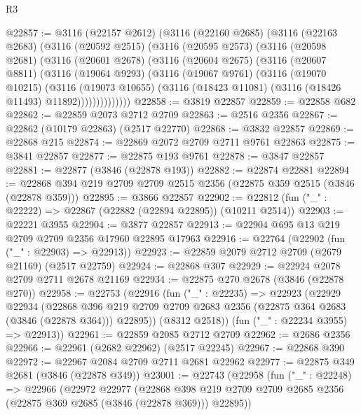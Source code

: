 \begin{lexlean}{R3}
\begin{coremodule}
@22857 := @3116
    (@22157 @2612)
    (@3116
      (@22160 @2685)
      (@3116
        (@22163 @2683)
        (@3116
          (@20592 @2515)
          (@3116
            (@20595 @2573)
            (@3116
              (@20598 @2681)
              (@3116
                (@20601 @2678)
                (@3116
                  (@20604 @2675)
                  (@3116
                    (@20607 @8811)
                    (@3116
                      (@19064 @9293)
                      (@3116
                        (@19067 @9761)
                        (@3116
                          (@19070 @10215)
                          (@3116
                            (@19073 @10655)
                            (@3116 (@18423 @11081) (@3116 (@18426 @11493) @11892))))))))))))))
@22858 := @3819 @22857
@22859 := @22858 @682
@22862 := @22859 @2073 @2712 @2709
@22863 := @2516 @2356
@22867 := @22862 (@10179 @22863) (@2517 @22770)
@22868 := @3832 @22857
@22869 := @22868 @215
@22874 := @22869 @2072 @2709 @2711 @9761 @22863
@22875 := @3841 @22857
@22877 := @22875 @193 @9761
@22878 := @3847 @22857
@22881 := @22877 (@3846 (@22878 @193))
@22882 := @22874 @22881
@22894 := @22868 @394 @219 @2709 @2709 @2515 @2356 (@22875 @359 @2515 (@3846 (@22878 @359)))
@22895 := @3866 @22857
@22902 := @22812 (fun ("_" : @22222) => @22867 (@22882 (@22894 @22895)) (@10211 @2514))
@22903 := @22221 @3955
@22904 := @3877 @22857
@22913 := @22904 @695 @13 @219 @2709 @2709 @2356 @17960 @22895 @17963
@22916 := @22764 (@22902 (fun ("_" : @22903) => @22913))
@22923 := @22859 @2079 @2712 @2709 (@2679 @21169) (@2517 @22759)
@22924 := @22868 @307
@22929 := @22924 @2078 @2709 @2711 @2678 @21169
@22934 := @22875 @270 @2678 (@3846 (@22878 @270))
@22958 := @22753
    (@22916
      (fun ("_" : @22235) =>
      @22923
        (@22929
          @22934
          (@22868
            @396
            @219
            @2709
            @2709
            @2683
            @2356
            (@22875 @364 @2683 (@3846 (@22878 @364)))
            @22895))
        (@8312 @2518))
      (fun ("_" : @22234 @3955) => @22913))
@22961 := @22859 @2085 @2712 @2709
@22962 := @2686 @2356
@22966 := @22961 (@2682 @22962) (@2517 @22245)
@22967 := @22868 @390
@22972 := @22967 @2084 @2709 @2711 @2681 @22962
@22977 := @22875 @349 @2681 (@3846 (@22878 @349))
@23001 := @22743
    (@22958
      (fun ("_" : @22248) =>
      @22966
        (@22972
          @22977
          (@22868
            @398
            @219
            @2709
            @2709
            @2685
            @2356
            (@22875 @369 @2685 (@3846 (@22878 @369)))
            @22895))

\end{coremodule}
\end{lexlean}
